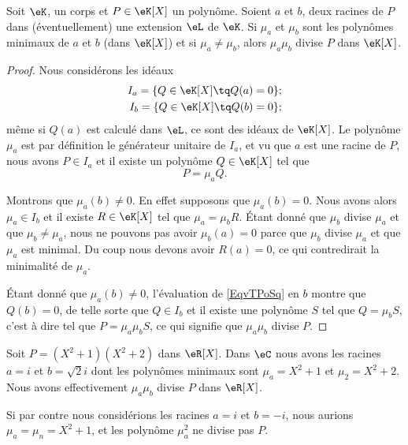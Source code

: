 \begin{proposition} \label{PropyMTEbH}
    Soit \( \eK\), un corps et \( P\in \eK[X]\) un polynôme. Soient \( a\) et \( b\), deux racines de \( P\) dans (éventuellement) une extension \( \eL\) de \( \eK\). Si \( \mu_a\) et \( \mu_b\) sont les polynômes minimaux de \( a\) et \( b\) (dans \( \eK[X]\)) et si \( \mu_a\neq \mu_b\), alors \( \mu_a\mu_b\) divise \( P\) dans \( \eK[X]\).
\end{proposition}

\begin{proof}
    Nous considérons les idéaux
    \begin{subequations}
        \begin{align}
            I_a=\{ Q\in \eK[X]\tq Q(a)=0 \};\\
            I_b=\{ Q\in \eK[X]\tq Q(b)=0 \};
        \end{align}
    \end{subequations}
    même si \( Q(a)\) est calculé dans \( \eL\), ce sont des idéaux de \( \eK[X]\). Le polynôme \( \mu_a\) est par définition le générateur unitaire de \( I_a\), et vu que \( a\) est une racine de \( P\), nous avons \( P\in I_a\) et il existe un polynôme \( Q\in \eK[X]\) tel que 
    \begin{equation}    \label{EqvTPoSq}
        P=\mu_aQ.
    \end{equation}

    Montrons que \( \mu_a(b)\neq 0\). En effet supposons que \( \mu_a(b)=0\). Nous avons alors \( \mu_a\in I_b\) et il existe \( R\in \eK[X]\) tel que \( \mu_a=\mu_bR\). Étant donné que \( \mu_b\) divise \( \mu_a\) et que \( \mu_b\neq \mu_a\), nous ne pouvons pas avoir \( \mu_b(a)=0\) parce que \( \mu_b\) divise \( \mu_a\) et que \( \mu_a\) est minimal. Du coup nous devons avoir \( R(a)=0\), ce qui contredirait la minimalité de \( \mu_a\).

    Étant donné que \( \mu_a(b)\neq 0\), l'évaluation de \eqref{EqvTPoSq} en \( b\) montre que \( Q(b)=0\), de telle sorte que \( Q\in I_b\) et il existe une polynôme \( S\) tel que \( Q=\mu_bS\), c'est à dire tel que \( P=\mu_a\mu_bS\), ce qui signifie que \( \mu_a\mu_b\) divise \( P\).
\end{proof}

\begin{example}
    Soit \( P=(X^2+1)(X^2+2)\) dans \( \eR[X]\). Dans \( \eC\) nous avons les racines \( a=i\) et \( b=\sqrt{2}i\) dont les polynômes minimaux sont \( \mu_a=X^2+1\) et \( \mu_2=X^2+2\). Nous avons effectivement \( \mu_a\mu_b\) divise \( P\) dans \( \eR[X]\).

    Si par contre nous considérions les racines \( a=i\) et \( b=-i\), nous aurions \( \mu_a=\mu_n=X^2+1\), et les polynôme \( \mu_a^2\) ne divise pas \( P\).
\end{example}

